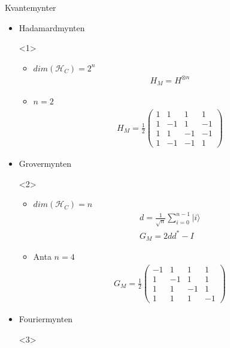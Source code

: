 \documentclass[norsk]{beamer}
\begin{document}
	\begin{frame}{Kvantemynter}
		\begin{itemize}
			\item Hadamardmynten
			\begin{onlyenv}<1>
				\begin{itemize}
					\item $dim(\mathcal{H}_C)=2^n$
					\begin{align*}
						H_M = H^{\otimes n}
					\end{align*}
					\item $n = 2$
					\begin{align*}
						H_M = \frac{1}{2} \begin{pmatrix*}
							1 & 1 & 1 & 1 \\
							1 & -1 & 1 & -1 \\
							1 & 1 & -1 & -1 \\
							1 & -1 & -1 & 1
						\end{pmatrix*}
					\end{align*}
				\end{itemize}
			\end{onlyenv}
			\item Grovermynten
			\begin{onlyenv}<2>
				\begin{center}
					\begin{itemize}
						\item $dim(\mathcal{H}_C)=n$
						\begin{align*}
							d = \frac{1}{\sqrt{n}}\sum_{i=0}^{n-1}|i\rangle \\
							G_M = 2dd^* - I
						\end{align*}
						\item Anta $n = 4$
						\begin{align*}
							G_M = \frac{1}{2} \begin{pmatrix*}
								-1 & 1 & 1 & 1 \\
								1 & -1 & 1 & 1 \\
								1 & 1 & -1 & 1 \\
								1 & 1 & 1 & -1
							\end{pmatrix*}
						\end{align*}
					\end{itemize}
				\end{center}
			\end{onlyenv}
			\item Fouriermynten
			\begin{onlyenv}<3>
				\begin{itemize}

\end{itemize}
\end{onlyenv}
\end{itemize}
\end{frame}
\end{document}
